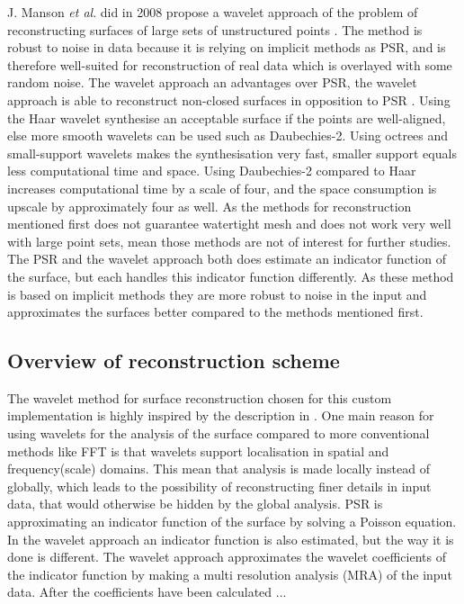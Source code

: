 J. Manson \textit{et al}. did in 2008 propose a wavelet approach of the problem of reconstructing surfaces of large sets of unstructured points \cite{Manson2008}. The method is robust to noise in data because it is relying on implicit methods as PSR, and is therefore well-suited for reconstruction of real data which is overlayed with some random noise. The wavelet approach an advantages over PSR, the wavelet approach is able to reconstruct non-closed surfaces in opposition to PSR \cite{Kazhdan2006}. Using the Haar wavelet synthesise an acceptable surface if the points are well-aligned, else more smooth wavelets can be used such as Daubechies-2. Using octrees and small-support wavelets makes the synthesisation very fast, smaller support equals less computational time and space. Using Daubechies-2 compared to Haar increases computational time by a scale of four, and the space consumption is upscale by approximately four as well. As the methods for reconstruction mentioned first does not guarantee watertight mesh and does not work very well with large point sets, mean those methods are not of interest for further studies. The PSR and the wavelet approach both does estimate an indicator function of the surface, but each handles this indicator function differently. As these method is based on implicit methods they are more robust to noise in the input and approximates the surfaces better compared to the methods mentioned first.

\subsection{Overview of reconstruction scheme}
The wavelet method for surface reconstruction chosen for this custom implementation is highly inspired by the description in \cite{Manson2008}. One main reason for using wavelets for the analysis of the surface compared to more conventional methods like FFT is that wavelets support localisation in spatial and frequency(scale) domains. This mean that analysis is made locally instead of globally, which leads to the possibility of reconstructing finer details in input data, that would otherwise be hidden by the global analysis. PSR is approximating an indicator function of the surface by solving a Poisson equation. In the wavelet approach an indicator function is also estimated, but the way it is done is different. The wavelet approach approximates the wavelet coefficients of the indicator function by making a multi resolution analysis (MRA) of the input data. After the coefficients have been calculated ...

